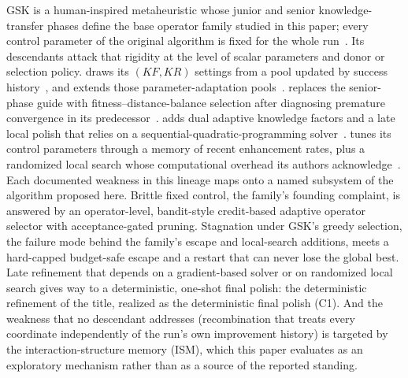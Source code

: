 GSK is a human-inspired metaheuristic whose junior and senior
knowledge-transfer phases define the base operator family studied in
this paper; every control parameter of the original algorithm is fixed
for the whole run~\cite{mohamed2020gaining}. %
Its descendants attack that rigidity at the level of scalar parameters and
donor or selection policy. \agsk{} draws its $(KF, KR)$ settings from a
pool updated by success history~\cite{mohamed2020agsk}, and \apgsk{}
extends those parameter-adaptation pools~\cite{apgsk2021}. \fdbagsk{}
replaces the senior-phase guide with fitness--distance-balance selection
after diagnosing premature convergence in its
predecessor~\cite{fdbagsk2023}. \egsk{} adds dual adaptive knowledge
factors and a late local polish that relies on a
sequential-quadratic-programming solver~\cite{jawad2024egsk}. \atmals{}
tunes its control parameters through a memory of recent enhancement rates,
plus a randomized local search whose computational overhead its authors
acknowledge~\cite{alfadli2025atmals}. %
Each documented weakness in this lineage maps onto a named subsystem of
the algorithm proposed here. Brittle fixed control, the family's
founding complaint, is answered by an operator-level, bandit-style
credit-based adaptive operator selector
with acceptance-gated pruning. Stagnation under GSK's greedy
selection, the failure mode behind the family's escape and local-search
additions, meets a hard-capped budget-safe escape and a restart
that can never lose the global best. Late refinement that depends on a
gradient-based solver or on randomized local search gives way to a
deterministic, one-shot final polish: the deterministic refinement of
the title, realized as the deterministic final polish (C1). And the weakness that no
descendant addresses (recombination that treats every coordinate
independently of the run's own improvement history) is targeted by the
interaction-structure memory (ISM), which this paper evaluates as an
exploratory mechanism rather than as a source of the reported standing.

